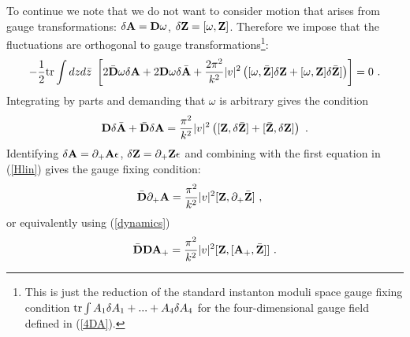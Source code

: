 \documentclass[12pt]{article}
\newcommand{\nn}{\nonumber}
\numberwithin{equation}{section}
\begin{document}
To continue we note that we do not want to consider motion that arises from gauge transformations: $\delta {\bf A} = {\bf D}\omega$, $\delta {\bf Z} = [\omega,{\bf Z}]$. Therefore we impose that the fluctuations are orthogonal to gauge transformations\footnote{This is just the reduction of the standard  instanton moduli space gauge fixing condition ${\rm tr}\int A_1\delta A_1 + ... +A_4\delta A_4$ for the four-dimensional gauge field defined in (\ref{4DA}).}:
\begin{equation}
-\frac12{\rm tr}\int dzd\bar z\ \left[ 2 \bar {\bf D} \omega  \delta {\bf A}  +  2  {\bf D} \omega\delta \bar {\bf A}  + \frac{2\pi^2}{k^2}|v|^2\left(  [\omega,\bar {\bf Z}] \delta {\bf Z}  +   [\omega,{\bf Z}] \delta \bar {\bf Z}] \right)\right] = 0\ .
\end{equation}
Integrating by parts and demanding that $\omega$ is arbitrary gives the condition
\begin{equation}
{\bf D}  \delta  \bar {\bf A} + \bar {\bf D}  \delta {\bf A} = \frac{\pi^2}{k^2}|v|^2\left([{\bf Z}, \delta \bar {\bf Z}]+[\bar {\bf Z},\delta {\bf Z}]\right)
 \ .
\end{equation}
Identifying $\delta {\bf A} = \partial_+ {\bf A}\epsilon$, $\delta {\bf Z} = \partial_+ {\bf Z}\epsilon $ and combining with the first equation in (\ref{Hlin}) gives the gauge fixing condition:
\begin{align}\label{ttt}
\bar {\bf D}  \partial_+{\bf A} &= \frac{\pi^2}{k^2}|v|^2[ {\bf Z},\partial_+ \bar {\bf Z}]\ , 
\end{align}
 or equivalently using (\ref{dynamics})
 \begin{equation}\label{Hlin4}
 \bar {\bf D} {\bf D}{\bf A}_+  = \frac{\pi^2}{k^2}|v|^2[ {\bf Z},[{\bf A}_+,\bar {\bf Z}]]\ .
 \end{equation}
 
\end{document}
